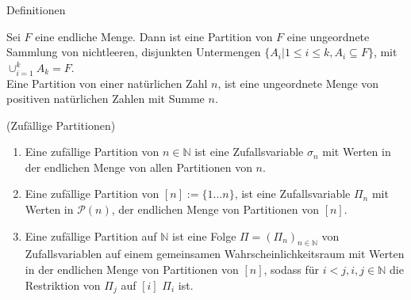 \begin{section}{Definitionen}
\begin{Definition}
   Sei $F$ eine endliche Menge. Dann ist eine Partition von $F$ eine ungeordnete Sammlung von nichtleeren, disjunkten Untermengen $\{A_i| 1 \leq i \leq k, A_i \subseteq F\}$, mit $\cup_{i=1}^{k}A_k = F$.\\
   Eine Partition von einer natürlichen Zahl $n$, ist eine ungeordnete Menge von positiven natürlichen Zahlen mit Summe $n$.
\end{Definition}
\begin{Definition}
    \textnormal{(Zufällige Partitionen)}
\begin{enumerate}
    \item Eine zufällige Partition von $n\in \mathbb{N}$ ist eine Zufallsvariable $\sigma_n$ mit Werten in der endlichen Menge von allen Partitionen von $n$.
    \item Eine zufällige Partition von $[n] := \{1 ...n\}$, ist eine Zufallsvariable $\Pi_n$ mit Werten in $\mathcal{P}(n)$, der endlichen Menge von Partitionen von $[n]$.
    \item Eine zufällige Partition auf $\mathbb{N}$ ist eine Folge $\Pi = (\Pi_n)_{n\in \mathbb{N}}$ von Zufallsvariablen auf einem gemeinsamen Wahrscheinlichkeitsraum mit Werten in der endlichen Menge von Partitionen von $[n]$, sodass für $i<j, i,j \in \mathbb{N}$ die Restriktion von $\Pi_j$ auf $[i]$ $\Pi_i$ ist.
\end{enumerate}


\end{Definition}
\end{section}
